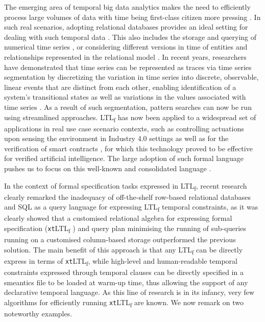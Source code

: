 \documentclass[sigconf]{acmart}
\begin{document}
The emerging area of temporal big data analytics makes the need to efficiently process large volumes of data with time being first-class citizen more pressing \cite{cuzzocrea:LIPIcs.TIME.2021.4,DBLP:reference/db/Amer-YahiaPTKDC18}. In such real scenarios, adopting relational databases provides an ideal setting for dealing with such temporal data \cite{DBLP:conf/caise/SchonigRCJM16}. This also includes the storage and querying of numerical
time series \cite{DBLP:journals/pacmmod/HuangZCS23}, or considering different versions in time of entities and relationships represented in the relational
model \cite{5963680,DBLP:journals/pvldb/KaufmannVFKF13,DBLP:journals/isci/WangJS95,DBLP:conf/cikm/Wang95}. In recent years, researchers have demonstrated that time series can be represented as traces via time series segmentation by discretizing the variation in time series into discrete, observable, linear events that are distinct from each other, enabling identification of a system's transitional states \cite{DBLP:journals/pacmmod/00080ZC23} as well as variations in the values associated with time series \cite{HUO2022117176}. As a result of such segmentation, pattern searches can now be run using streamlined approaches. LTL\textsubscript{f} has now been applied to a widespread set of applications in real use case scenario contexts, such as controlling actuations upon sensing the environment in Industry 4.0 settings  \cite{9591387} as well as for the verification of smart contracts \cite{10.1007/978-3-031-08421-8_9}, for which this technology proved to be effective for verified artificial intelligence. The large adoption of such formal language  pushes us to focus on this well-known and consolidated language \cite{4567924,DBLP:conf/ijcai/GiacomoV13}.

In the context of formal specification tasks expressed in LTL\textsubscript{f}, recent research clearly remarked the inadequacy of off-the-shelf row-based relational databases and SQL as a query language for expressing LTL\textsubscript{f} temporal constraints, as it was clearly showed that a customised relational algebra for expressing formal specification (\texttt{xt}LTL\textsubscript{f} \cite{info14030173}) and query plan minimising the running of sub-queries \cite{BellatrecheKB21} running on a customised column-based storage outperformed the previous solution. The main benefit of this approach is that any LTL\textsubscript{f} can be directly express in terms of \texttt{xt}LTL\textsubscript{f}, while high-level and human-readable temporal constraints expressed through temporal clauses can be directly specified in a smeantics file to be loaded at warm-up time, thus allowing the support of any declarative temporal language. As this line of research is in its infancy, very few algorithms for efficiently running \texttt{xt}LTL\textsubscript{f} are known. We now remark on two noteworthy examples.
\end{document}
